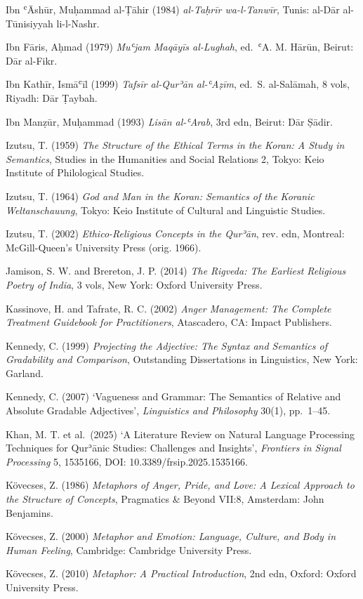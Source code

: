 \documentclass[11pt,a4paper]{article}
\begin{document}
Ibn ʿĀshūr, Muḥammad al-Ṭāhir (1984) \emph{al-Taḥrīr wa-l-Tanwīr},
Tunis: al-Dār al-Tūnisiyyah li-l-Nashr.

Ibn Fāris, Aḥmad (1979) \emph{Muʿjam Maqāyīs al-Lughah}, ed.~ʿA. M.
Hārūn, Beirut: Dār al-Fikr.

Ibn Kathīr, Ismāʿīl (1999) \emph{Tafsīr al-Qurʾān al-ʿAẓīm}, ed.~S.
al-Salāmah, 8 vols, Riyadh: Dār Ṭaybah.

Ibn Manẓūr, Muḥammad (1993) \emph{Lisān al-ʿArab}, 3rd edn, Beirut: Dār
Ṣādir.

Izutsu, T. (1959) \emph{The Structure of the Ethical Terms in the Koran:
A Study in Semantics}, Studies in the Humanities and Social Relations 2,
Tokyo: Keio Institute of Philological Studies.

Izutsu, T. (1964) \emph{God and Man in the Koran: Semantics of the
Koranic Weltanschauung}, Tokyo: Keio Institute of Cultural and
Linguistic Studies.

Izutsu, T. (2002) \emph{Ethico-Religious Concepts in the Qurʾān}, rev.
edn, Montreal: McGill-Queen's University Press (orig. 1966).

Jamison, S. W. and Brereton, J. P. (2014) \emph{The Rigveda: The
Earliest Religious Poetry of India}, 3 vols, New York: Oxford University
Press.

Kassinove, H. and Tafrate, R. C. (2002) \emph{Anger Management: The
Complete Treatment Guidebook for Practitioners}, Atascadero, CA: Impact
Publishers.

Kennedy, C. (1999) \emph{Projecting the Adjective: The Syntax and
Semantics of Gradability and Comparison}, Outstanding Dissertations in
Linguistics, New York: Garland.

Kennedy, C. (2007) `Vagueness and Grammar: The Semantics of Relative and
Absolute Gradable Adjectives', \emph{Linguistics and Philosophy} 30(1),
pp.~1--45.

Khan, M. T. et al.~(2025) `A Literature Review on Natural Language
Processing Techniques for Qurʾānic Studies: Challenges and Insights',
\emph{Frontiers in Signal Processing} 5, 1535166, DOI:
10.3389/frsip.2025.1535166.

Kövecses, Z. (1986) \emph{Metaphors of Anger, Pride, and Love: A Lexical
Approach to the Structure of Concepts}, Pragmatics \& Beyond VII:8,
Amsterdam: John Benjamins.

Kövecses, Z. (2000) \emph{Metaphor and Emotion: Language, Culture, and
Body in Human Feeling}, Cambridge: Cambridge University Press.

Kövecses, Z. (2010) \emph{Metaphor: A Practical Introduction}, 2nd edn,
Oxford: Oxford University Press.
\end{document}
